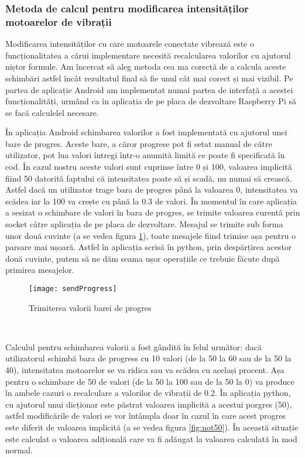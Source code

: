 \documentclass[../IoMusT.tex]{subfiles}
\begin{document}
\subsubsection{Metoda de calcul pentru modificarea intensităților motoarelor de vibrații}
Modificarea intensităților cu care motoarele conectate vibrează este o funcționalitatea a cărui implementare necesită recalcularea valorilor cu ajutorul niștor formule. Am încercat să aleg metoda cea ma corectă de a calcula aceste schimbări astfel încât rezultatul final să fie unul cât mai corect și mai vizibil. Pe partea de aplicație Android am implementat numai partea de interfață a acestei funcționalități, urmând ca în aplicația de pe placa de dezvoltare Raspberry Pi să se facă calculelel necesare.
\\ %
\par În aplicația Android schimbarea valorilor a fost implementată cu ajutorul unei bare de progres. Aceste bare, a căror progrese pot fi setat manual de către utilizator, pot lua valori întregi într-o anumită limită ce poate fi specificată în cod. În cazul nostru aceste valori sunt cuprinse între 0 și 100, valoarea implicită fiind 50 datorită faptului că intensitatea poate să și scadă, nu numai să crească. Astfel dacă un utilizator trage bara de progres până la valoarea 0, intensitatea va scădea iar la 100 va crește cu până la 0.3 de valori. În momentul în care aplicația a sesizat o schimbare de valori în bara de progres, se trimite valoarea curentâ prin socket câtre aplicația de pe placa de dezvoltare. Mesajul se trimite sub forma unor două cuvinte (a se vedea figura \ref{fig:sendProgress}), toate mesajele fiind trimise așa pentru o parsare mai ușoară. Astfel în aplicația scrisă în python, prin despărțirea acestor două cuvinte, putem să ne dăm seama ușor operațiile ce trebuie făcute după primirea mesajelor.
\begin{figure}[h]
\centering
\texttt{[image: sendProgress]}
\caption{Trimiterea valorii barei de progres}
\label{fig:sendProgress}
\end{figure} 
\\
\par Calculul pentru schimbarea valorii a fost gândită în felul următor: dacă utilizatorul schimbă bara de progress cu 10 valori (de la 50 la 60 sau de la 50 la 40), intensitatea motoarelor se va ridica sau va scădea cu același procent. Așa pentru o schimbare de 50 de valori (de la 50 la 100 sau de la 50 la 0) va produce în ambele cazuri o recalculare a valorilor de vibrații de 0.2. În aplicația python, cu ajutorul unui dicționar este păstrat valoarea implicită a acestui porgres (50), astfel modificările de valori se vor întâmpla doar în cazul în care acest progres este diferit de valoarea implicită (a se vedea figura \ref{fig:not50}). În această situație este calculat o valoarea adițională care va fi adăugat la valoarea calculată în mod normal.
\end{document}
